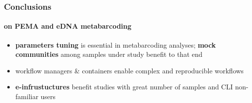 \documentclass{beamer}
\begin{document}
\begin{frame}
\begin{singlespace}
\begin{textblock*}{5cm}
         \end{textblock*}

      \end{singlespace}

   \end{frame}

   \begin{frame}
      \frametitle{Conclusions}
      \framesubtitle{on PEMA and eDNA metabarcoding}

      \begin{itemize}
         \item \textbf{parameters tuning} is essential in metabarcoding analyses;
               \textbf{mock communities} among samples under study benefit to that end
         \item workflow managers \& containers enable complex and reproducible workflows 
         \item \textbf{e-infrustuctures} benefit studies with great number of samples and CLI non-familiar users
      \end{itemize}


   \end{frame}
\end{document}
